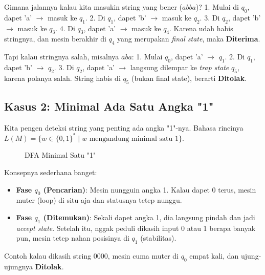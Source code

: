 \documentclass[12pt,a4paper]{article}
\begin{document}
Gimana jalannya kalau kita masukin string yang bener ($abba$)?
1. Mulai di $q_0$, dapet 'a' $\rightarrow$ masuk ke $q_1$.
2. Di $q_1$, dapet 'b' $\rightarrow$ masuk ke $q_2$.
3. Di $q_2$, dapet 'b' $\rightarrow$ masuk ke $q_3$.
4. Di $q_3$, dapet 'a' $\rightarrow$ masuk ke $q_4$.
Karena udah habis stringnya, dan mesin berakhir di $q_4$ yang merupakan \textit{final state}, maka \textbf{Diterima}.

Tapi kalau stringnya salah, misalnya $aba$:
1. Mulai $q_0$, dapet 'a' $\rightarrow$ $q_1$.
2. Di $q_1$, dapet 'b' $\rightarrow$ $q_2$.
3. Di $q_2$, dapet 'a' $\rightarrow$ langsung dilempar ke \textit{trap state} $q_5$, karena polanya salah.
String habis di $q_5$ (bukan final state), berarti \textbf{Ditolak}.

\subsection{Kasus 2: Minimal Ada Satu Angka "1"}
Kita pengen deteksi string yang penting ada angka "1"-nya. Bahasa rincinya $L(M) = \{ w \in \{0,1\}^* \mid w \text{ mengandung minimal satu } 1 \}$.

\begin{figure}[h]
    \centering
    \caption{DFA Minimal Satu "1"}
\end{figure}

Konsepnya sederhana banget:
\begin{itemize}
    \item \textbf{Fase $q_0$ (Pencarian)}: Mesin nungguin angka 1. Kalau dapet 0 terus, mesin muter (loop) di situ aja dan statusnya tetep nunggu.
    \item \textbf{Fase $q_1$ (Ditemukan)}: Sekali dapet angka 1, dia langsung pindah dan jadi \textit{accept state}. Setelah itu, nggak peduli dikasih input 0 atau 1 berapa banyak pun, mesin tetep nahan posisinya di $q_1$ (stabilitas).
\end{itemize}
Contoh kalau dikasih string $0000$, mesin cuma muter di $q_0$ empat kali, dan ujung-ujungnya \textbf{Ditolak}.
\end{document}
